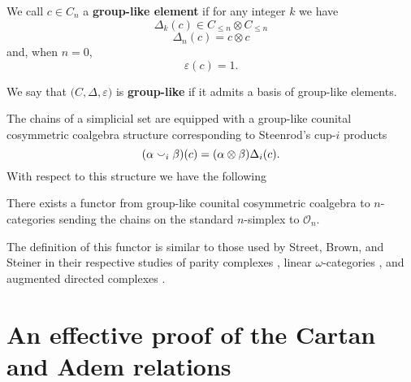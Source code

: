 We call $c \in C_n$ a \textbf{group-like element} if for any integer $k$ we have
\begin{equation*}
\Delta_k (c) \in C_{\leq n} \otimes C_{\leq n}
\end{equation*}
\begin{equation*}
\Delta_n(c) = c \otimes c
\end{equation*}
and, when $n = 0$,
\begin{equation*}
\varepsilon(c) = 1.
\end{equation*}

We say that $\big( C, \Delta , \varepsilon \big)$ is \textbf{group-like} if it admits a basis of group-like elements.

The chains of a simplicial set are equipped with a group-like counital cosymmetric coalgebra structure corresponding to Steenrod's cup-$i$ products
\begin{equation*}
(\alpha \smallsmile_{i} \beta)(c) = (\alpha \otimes \beta)\Delta_i(c).
\end{equation*}
With respect to this structure we have the following
\begin{theorem} 
	There exists a functor from group-like counital cosymmetric coalgebra to $n$-categories sending the chains on the standard $n$-simplex to $\mathcal O_n$.
\end{theorem}

The definition of this functor is similar to those used by Street, Brown, and Steiner in their respective studies of parity complexes \cite{street1991parity}, linear $\omega$-categories \cite{brown2003cubical}, and augmented directed complexes \cite{steiner2004omega}.

\section{An effective proof of the Cartan and Adem relations}

